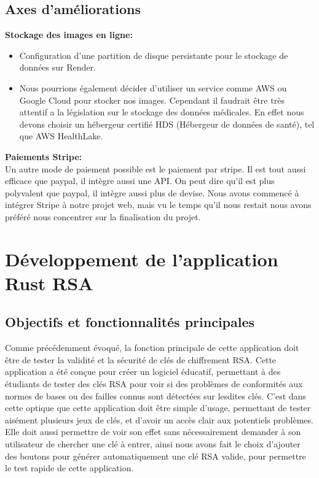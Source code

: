 \documentclass[12pt]{article} %
\begin{document}
	\subsection{Axes d'améliorations}
	\textbf{Stockage des images en ligne:}\\
	\begin{itemize}
		\item Configuration d'une partition de disque persistante pour le stockage de données sur Render.
		
		\item Nous pourrions également décider d'utiliser un service comme AWS ou Google Cloud pour stocker nos images. Cependant il faudrait être très attentif a la législation sur le stockage des données médicales. En effet nous devons choisir un hébergeur certifié HDS (Hébergeur de données de santé), tel que AWS HealthLake.
	\end{itemize}
	
    \textbf{Paiements Stripe:}\\
            Un autre mode de paiement possible est le paiement par stripe. Il est tout aussi efficace que paypal, il intègre aussi une API. On peut dire qu’il est plus polyvalent que paypal, il intègre aussi plus de devise.
            Nous avons commencé à intégrer Stripe à notre projet web, mais vu le temps qu’il nous restait nous avons préféré nous concentrer sur la finalisation du projet.

		

	
\newpage
\section{Développement de l'application Rust RSA}
	\subsection{Objectifs et fonctionnalités principales}
		Comme précédemment évoqué, la fonction principale de cette application doit être de tester la validité et la sécurité de clés de chiffrement RSA. Cette application a été conçue pour créer un logiciel éducatif, permettant à des étudiants de tester des clés RSA pour voir si des problèmes de conformités aux normes de bases ou des failles connus sont détectées sur lesdites clés.
	C’est dans cette optique que cette application doit être simple d’usage, permettant de tester aisément plusieurs jeux de clés, et d’avoir un accès clair aux potentiels problèmes. Elle doit aussi permettre de voir son effet sans nécessairement demander à son utilisateur de chercher une clé à entrer, ainsi nous avons fait le choix d’ajouter des boutons pour générer automatiquement une clé RSA valide, pour permettre le test rapide de cette application.
\end{document}
